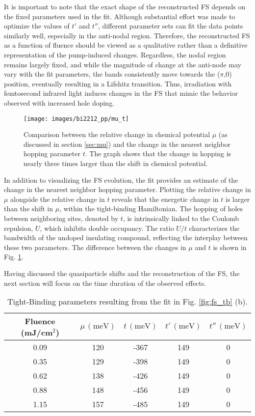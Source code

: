 It is important to note that the exact shape of the reconstructed FS depends on the fixed parameters used in the fit.
Although substantial effort was made to optimize the values of $t'$ and $t''$, different parameter sets can fit the data points similarly well, especially in the anti-nodal region.
Therefore, the reconstructed FS as a function of fluence should be viewed as a qualitative rather than a definitive representation of the pump-induced changes.
Regardless, the nodal region remains largely fixed, and while the magnitude of change at the anti-node may vary with the fit parameters, the bands consistently move towards the ($\pi$,$0$) position, eventually resulting in a Lifshitz transition.
Thus, irradiation with femtosecond infrared light induces changes in the FS that mimic the behavior observed with increased hole doping.

\begin{figure}
	\centering
	\texttt{[image: images/bi2212\_pp/mu\_t]}
	\caption{Comparison between the relative change in chemical potential $\mu$ (as discussed in section \ref{sec:mu}) and the change in the nearest neighbor hopping parameter $t$. The graph shows that the change in hopping is nearly three times larger than the shift in chemical potential.}
	\label{fig:mu_t}
\end{figure}

In addition to visualizing the FS evolution, the fit provides an estimate of the change in the nearest neighbor hopping parameter.
Plotting the relative change in $\mu$ alongside the relative change in $t$ reveals that the energetic change in $t$ is larger than the shift in $\mu$, within the tight-binding Hamiltonian.
The hopping of holes between neighboring sites, denoted by $t$, is intrinsically linked to the Coulomb repulsion, $U$, which inhibits double occupancy.
The ratio $U/t$ characterizes the bandwidth of the undoped insulating compound, reflecting the interplay between these two parameters.
The difference between the changes in $\mu$ and $t$ is shown in Fig. \ref{fig:mu_t}.

Having discussed the quasiparticle shifts and the reconstruction of the FS, the next section will focus on the time duration of the observed effects.

\begin{table}[h!]
	\centering
	\begin{tabular}{ccccc}
		\toprule[1pt]\midrule[0.3pt]
		Fluence (mJ/cm\(^2\)) & \(\mu \, (\text{meV})\) & \(t \, (\text{meV})\) & \(t' \, (\text{meV})\) & \(t'' \, (\text{meV})\) \\ 
		\midrule
		0.09 & 120 & -367 & 149 & 0 \\ 
		0.35 & 129 & -398 & 149 & 0 \\ 
		0.62 & 138 & -426 & 149 & 0 \\ 
		0.88 & 148 & -456 & 149 & 0 \\ 
		1.15 & 157 & -485 & 149 & 0 \\ 
		\midrule[0.3pt]\bottomrule[1pt]
	\end{tabular}
	\caption{Tight-Binding parameters resulting from the fit in Fig. \ref{fig:fs_tb} (b).}
	\label{tab:tb}
\end{table}


